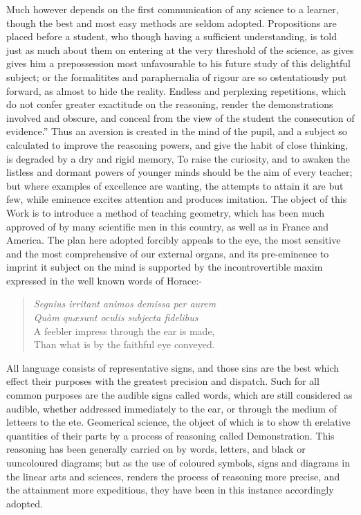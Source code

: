     Much however depends on the first communication of any science to a
    learner, though the best and most easy methods are seldom adopted.
    Propositions are placed before a student, who though having a
    sufficient understanding, is told just as much about them on entering
    at the very threshold of the science, as gives gives him a
    prepossession most unfavourable to his future study of this delightful
    subject; or the formalitites and paraphernalia of rigour are so
    ostentatiously put forward, as almost to hide the reality. Endless and
    perplexing repetitions, which do not confer greater exactitude on the
    reasoning, render the demonstrations involved and obscure, and conceal
    from the view of the student the consecution of evidence.'' Thus an
    aversion is created in the mind of the pupil, and a subject so
    calculated to improve the reasoning powers, and give the habit of
    close thinking, is degraded by a dry and rigid memory, To raise the
    curiosity, and to awaken the listless and dormant powers of younger
    minds should be the aim of every teacher; but where examples of
    excellence are wanting, the attempts to attain it are but few, while
    eminence excites attention and produces imitation. The object of this
    Work is to introduce a method of teaching geometry, which has been
    much approved of by many scientific men in this country, as well as
    in France and America. The plan here adopted forcibly appeals to the
    eye, the most sensitive and the most comprehensive of our external
    organs, and its pre-eminence to imprint it subject on the mind is
    supported by the incontrovertible maxim expressed in the well known
    words of Horace:- 
    \begin{quotation}
        \noindent\textit{Segnius irritant animos demissa per aurem \\
        Qu\`am qu\ae sunt oculis subjecta fidelibus} \\
        A feebler impress through the ear is made,\\
        Than what is by the faithful eye conveyed.
    \end{quotation}
    All language consists of representative signs, and those sins are the
    best which effect their purposes with the greatest precision and
    dispatch. Such for all common purposes are the audible signs called
    words, which are still considered as audible, whether addressed
    immediately to the ear, or through the medium of letteers to the ete.
    Geomerical science, the object of which is to show th erelative
    quantities of their parts by a process of reasoning called
    Demonstration. This reasoning has been generally carried on by words,
    letters, and black or uuncoloured diagrams; but as the use of coloured
    symbols, signs and diagrams in the linear arts and sciences, renders
    the process of reasoning more precise, and the attainment more
    expeditious, they have been in this instance accordingly adopted. 

